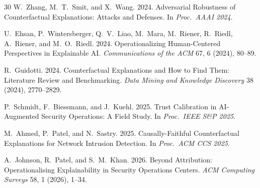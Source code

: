 \documentclass[sigconf,nonacm]{acmart}
\begin{document}
\begin{thebibliography}{30}
W.~Zhang, M.~T.~Smit, and X.~Wang. 2024. Adversarial Robustness of
Counterfactual Explanations: Attacks and Defenses. In
\textit{Proc.\ AAAI 2024}.

U.~Ehsan, P.~Wintersberger, Q.~V.~Liao, M.~Mara, M.~Riener, R.~Riedl,
A.~Riener, and M.~O.~Riedl. 2024. Operationalizing Human-Centered
Perspectives in Explainable AI. \textit{Communications of the ACM} 67, 6
(2024), 80--89.

R.~Guidotti. 2024. Counterfactual Explanations and How to Find Them:
Literature Review and Benchmarking. \textit{Data Mining and Knowledge
Discovery} 38 (2024), 2770--2829.

P.~Schmidt, F.~Biessmann, and J.~Kuehl. 2025. Trust Calibration in
AI-Augmented Security Operations: A Field Study. In \textit{Proc.\ IEEE
S\&P 2025}.

M.~Ahmed, P.~Patel, and N.~Sastry. 2025. Causally-Faithful Counterfactual
Explanations for Network Intrusion Detection. In \textit{Proc.\ ACM CCS 2025}.

A.~Johnson, R.~Patel, and S.~M.~Khan. 2026. Beyond Attribution:
Operationalising Explainability in Security Operations Centers.
\textit{ACM Computing Surveys} 58, 1 (2026), 1--34.

\end{thebibliography}
\end{document}
